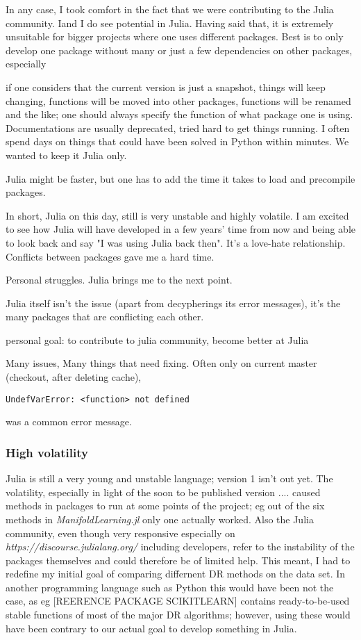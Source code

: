 \documentclass[journal, a4paper]{IEEEtran}
\begin{document}
In any case, I took comfort in the fact that we were contributing to the Julia community. Iand I do see potential in Julia. Having said that, it is extremely unsuitable for bigger projects where one uses different packages. Best is to only develop one package without many or just a few dependencies on other packages, especially 

if one considers that the current version is just a snapshot, things will keep changing, functions will be moved into other packages, functions will be renamed and the like; one should always specify the function of what package one is using. Documentations are usually deprecated, tried hard to get things running. I often spend days on things that could have been solved in Python within minutes. We wanted to keep it Julia only.

Julia might be faster, but one has to add the time it takes to load and precompile packages.

In short, Julia on this day, still is very unstable and highly volatile. I am excited to see how Julia will have developed in a few years' time from now and being able to look back and say "I was using Julia back then". It's a love-hate relationship. 
Conflicts between packages gave me a hard time. 

Personal struggles.
Julia brings me to the next point. 

Julia itself isn't the issue (apart from decypherings its error messages), it's the many packages that are conflicting each other.


personal goal: to contribute to julia community, become better at Julia


Many issues, Many things that need fixing.
Often only on current master (checkout, after deleting cache), \begin{verbatim}
UndefVarError: <function> not defined
\end{verbatim}
was a common error message.



\subsubsection{High volatility}
Julia is still a very young and unstable language; version 1 isn't out yet. The volatility, especially in light of the soon to be published version ....
caused methods in packages to run at some points of the project; eg out of the six methods in \textit{ManifoldLearning.jl} only one actually worked. 
Also the Julia community, even though very responsive especially on \textit{https://discourse.julialang.org/} including developers, refer to the instability of the packages themselves and could therefore be of limited help. %
This meant, I had to redefine my initial goal of comparing differnent DR methods on the data set.
In another programming language such as Python this would have been not the case, as eg [REERENCE PACKAGE SCIKITLEARN] contains ready-to-be-used stable functions of most of the major DR algorithms; however, using these would have been contrary to our actual goal to develop something in Julia.
\end{document}
